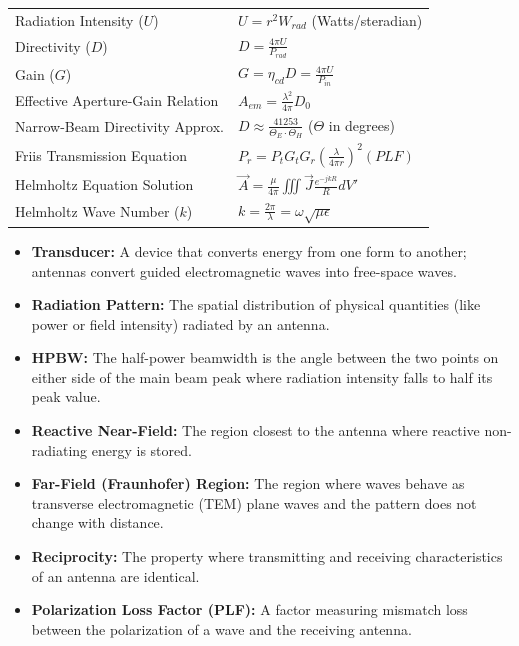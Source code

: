 \documentclass[12pt,a4paper]{article}
\renewcommand{\arraystretch}{1.45}
\begin{document}
\begin{tcolorbox}[formulabox, title={\textbf{Key Formulas and Metrics at a Glance}}]
\renewcommand{\arraystretch}{1.35}
\begin{tabularx}{\linewidth}{B{5.0cm} X}
Radiation Intensity ($U$) & $U = r^2 W_{rad}$ \quad (Watts/steradian) \\[4pt]
Directivity ($D$) & $D = \frac{4\pi U}{P_{rad}}$ \\[4pt]
Gain ($G$) & $G = \eta_{cd} D = \frac{4\pi U}{P_{in}}$ \\[4pt]
Effective Aperture-Gain Relation & $A_{em} = \frac{\lambda^2}{4\pi} D_0$ \\[4pt]
Narrow-Beam Directivity Approx. & $D \approx \frac{41253}{\Theta_E \cdot \Theta_H}$ \quad ($\Theta$ in degrees) \\[4pt]
Friis Transmission Equation & $P_r = P_t G_t G_r \left( \frac{\lambda}{4\pi r} \right)^{\!2} (PLF)$ \\[4pt]
Helmholtz Equation Solution & $\vec{A} = \frac{\mu}{4\pi} \iiint \vec{J} \frac{e^{-jkR}}{R} dV'$ \\[4pt]
Helmholtz Wave Number ($k$) & $k = \frac{2\pi}{\lambda} = \omega\sqrt{\mu\epsilon}$ \\[4pt]
\end{tabularx}
\end{tcolorbox}

\begin{tcolorbox}[defbox, title={\textbf{One-Line Definitions}}]
\begin{itemize}[leftmargin=*, itemsep=2pt, topsep=0pt]
  \item \textbf{Transducer:} A device that converts energy from one form to another; antennas convert guided electromagnetic waves into free-space waves.
  \item \textbf{Radiation Pattern:} The spatial distribution of physical quantities (like power or field intensity) radiated by an antenna.
  \item \textbf{HPBW:} The half-power beamwidth is the angle between the two points on either side of the main beam peak where radiation intensity falls to half its peak value.
  \item \textbf{Reactive Near-Field:} The region closest to the antenna where reactive non-radiating energy is stored.
  \item \textbf{Far-Field (Fraunhofer) Region:} The region where waves behave as transverse electromagnetic (TEM) plane waves and the pattern does not change with distance.
  \item \textbf{Reciprocity:} The property where transmitting and receiving characteristics of an antenna are identical.
  \item \textbf{Polarization Loss Factor (PLF):} A factor measuring mismatch loss between the polarization of a wave and the receiving antenna.
\end{itemize}
\end{tcolorbox}
\end{document}
